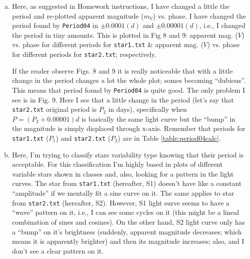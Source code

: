 \begin{enumerate} [a)]
\item Here, as suggested in Homework instructions, I have changed a little the period and re-plotted apparent magnitude ($m_V$) vs. phase. I have changed the period found by \texttt{Period04} in $\pm 0.0001 (d)$ and $\pm 0.00001 (d)$, i.e., I changed the period in tiny amounts. This is plotted in Fig 8 and 9: apparent mag. ($V$) vs. phase for different periods for \texttt{star1.txt} \&  apparent mag. ($V$) vs. phase for different periods for \texttt{star2.txt}; respectively.

If the reader observe Figs. 8 and 9 it is really noticeable that with a little change in the period changes a lot the whole plot; somes becoming ``dubious''. This means that period found by \texttt{Period04} is quite good. The only problem I see is in Fig. 9. Here  I see that a little change in the period (let's say that \texttt{star2.txt} original period is $P_2$ in days), specifically when $P = (P_2 + 0.00001) d$ is basically the same light curve but the ``bump'' in the magnitude is simply displaced through x-axis. Remember that periods for \texttt{star1.txt} ($P_1$) and \texttt{star2.txt} ($P_2$) are in Table \ref{table:period04calc}.



\item Here, I'm trying to classify stars variability type knowing that their period is acceptable. For this classification I'm highly based in plots of different variable stars shown in classes and, also, looking for a pattern in the light curves. The star from \texttt{star1.txt} (hereafter, S1) doesn't have like a constant ``amplitude'' if we mentally fit a sine curve on it. The same applies to star from \texttt{star2.txt} (hereafter, S2). However, S1 light surve seems to have a ``wave'' pattern on it, i.e., I can see some cycles on it (this might be a lineal combination of sines and cosines). On the other hand, S2 light curve only has a ``bump'' on it's brightness (suddenly, apparent magnitude decreases; which means it is apparently brighter) and then its magnitude increases; also, and I don't see a clear pattern on it.


\end{enumerate}
